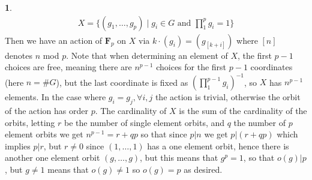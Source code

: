 \documentclass[10.5pt]{article}
\theoremstyle{definition}
\newtheorem{pb}{}
\newcommand{\set}[1]{\{#1\}}
\newcommand{\tand}{\text{ and }}
\begin{document}
    \begin{pb}
        \begin{align*}
            X = \set{(g_1,\hdots,g_p) \mid g_i \in G \tand \prod_1^p g_i = 1}
        \end{align*}
        Then we have an action of \(\mathbf{F}_p\) on \(X\) via \(k\cdot(g_i) = (g_{[k + i]})\) where \([n]\) denotes \(n\) mod \(p\). Note that when determining an element of \(X\), the first \(p-1\) choices are free, meaning there are \(n^{p-1}\) choices for the first \(p-1\) coordinates (here \(n = \#G\)), but the last coordinate is fixed as \(\left(\prod_1^{p-1}g_i\right)^{-1}\), so \(X\) has \(n^{p-1}\) elements. In the case where \(g_i = g_j, \forall i,j\) the action is trivial, otherwise the orbit of the action has order \(p\). The cardinality of \(X\) is the sum of the cardinality of the orbits, letting \(r\) be the number of single element orbits, and \(q\) the number of \(p\) element orbits we get \(n^{p-1} = r + qp\) so that since \(p \vert n\) we get \(p \vert (r + qp)\) which implies \(p \vert r\), but \(r \neq 0\) since \((1,\hdots,1)\) has a one element orbit, hence there is another one element orbit \((g,\hdots,g)\), but this means that \(g^p = 1\), so that \(o(g) \vert p\), but \(g \neq 1\) means that \(o(g) \neq 1\) so \(o(g) = p\) as desired.
    \end{pb}
\end{document}

